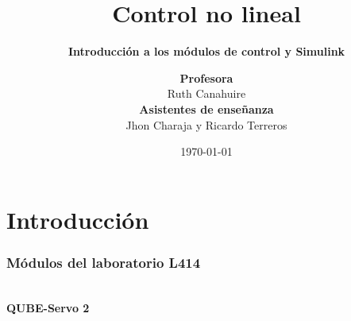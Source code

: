 

\title[Laboratorio 0]{Control no lineal}
\subtitle{\textbf{Introducción a los módulos de control y Simulink}}

\author[J. Charaja and R. Terreros (UTEC)]{\textbf {Profesora} \\ Ruth Canahuire \\ \vspace{1em} \textbf{Asistentes de enseñanza} \\ Jhon Charaja y Ricardo Terreros}


\date{\today}



	\frame{\titlepage}
	
	
	
	
	
	\section{Introducción}

	\begin{frame}
		\frametitle{Módulos del laboratorio L414}
		\begin{minipage}[t]{0.47\textwidth}
			\graphicspath{{imgs/qube/}}
			\centering
			 \\
			\vspace{1em}
			{\large \textbf{QUBE-Servo 2\footnotemark[1]}}
		\end{minipage}
				
	\end{frame}

